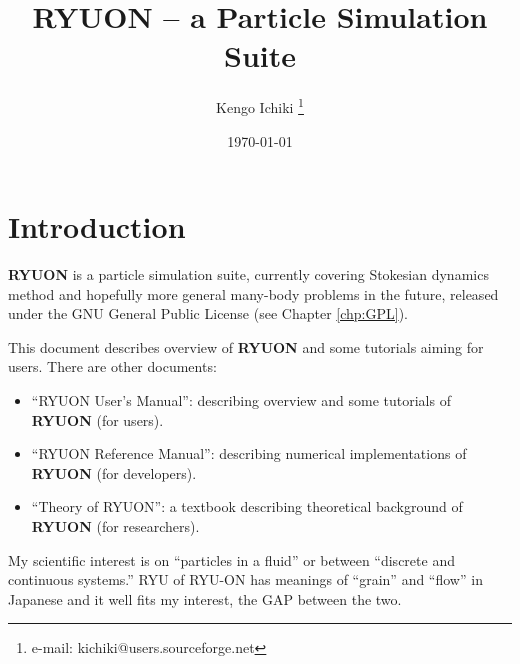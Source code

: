 \documentclass{book}
\begin{document}
\title{RYUON -- a Particle Simulation Suite}
\author{Kengo Ichiki
 \thanks{e-mail: kichiki@users.sourceforge.net}}
\date{\today}

\maketitle

\tableofcontents

\chapter{Introduction}
{\bf RYUON} is a particle simulation suite,
currently covering Stokesian dynamics method
and hopefully more general many-body problems in the future,
released under the GNU General Public License (see Chapter \ref{chp:GPL}).


This document describes overview of {\bf RYUON} and 
some tutorials aiming for users.
There are other documents:
\begin{itemize}
\item ``RYUON User's Manual'':
  describing overview and some tutorials of {\bf RYUON} (for users).
\item ``RYUON Reference Manual'':
  describing numerical implementations 
  of {\bf RYUON} (for developers).
\item ``Theory of RYUON'':
  a textbook describing theoretical background of {\bf RYUON}
  (for researchers).
\end{itemize}


My scientific interest is on ``particles in a fluid'' 
or between ``discrete and continuous systems.''
RYU of RYU-ON has meanings of ``grain'' and ``flow'' 
in Japanese and it well fits my interest, the GAP between the two.
\end{document}
